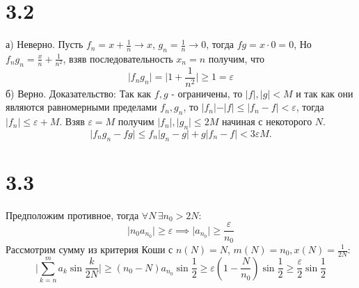 \documentclass[12pt]{article}
\begin{document}
\section{3.2}
а) Неверно. Пусть $f_n = x + \frac{1}{n} \to x$, $g_n = \frac{1}{n} \to 0$, тогда $f g = x \cdot 0 = 0$, 
Но $f_n g_n = \frac{x}{n} + \frac{1}{n^2}$, взяв последовательность $x_n = n$ получим, что 
\[
    \vert f_n g_n \vert = \vert 1 + \frac{1}{n^2} \vert \geq 1 = \varepsilon   
\]     
б) Верно. Доказательство: 
Так как $f, g$ - ограничены, то $\vert f \vert, \vert g \vert < M$ и так как они являются равномерными 
пределами $f_n, g_n$, то $\vert f_n \vert - \vert f \vert \leq \vert f_n - f \vert < \varepsilon$, тогда 
$\vert f_n \vert \leq \varepsilon + M$. Взяв $\varepsilon = M$ получим $\vert f_n \vert, \vert g_n \vert \leq 2M$ начиная с 
некоторого $N$.
\[
    \vert f_n g_n - f g \vert \leq f_n \vert g_n - g \vert + g \vert f_n - f \vert < 3 \varepsilon M.  
\]
\section{3.3}
Предположим противное, тогда $\forall N \, \exists n_0 > 2 N$: 
\[
    \vert n_0 a_{n_0} \vert \geq \varepsilon \implies \vert a_{n_0} \vert \geq \frac{\varepsilon}{n_0} 
\]
Рассмотрим сумму из критерия Коши с $n(N) = N$, $m(N) = n_0, x(N) = \frac{1}{2N}$: 
\[
    \vert \sum_{k=n}^{m} a_k \sin \frac{k}{2N} \vert \geq (n_0 - N) a_{n_0} \sin \frac{1}{2} \geq 
    \varepsilon \left( 1 - \frac{N}{n_0} \right) \sin \frac{1}{2} \geq \frac{\varepsilon}{2} \sin \frac{1}{2}
\]  
\end{document}
